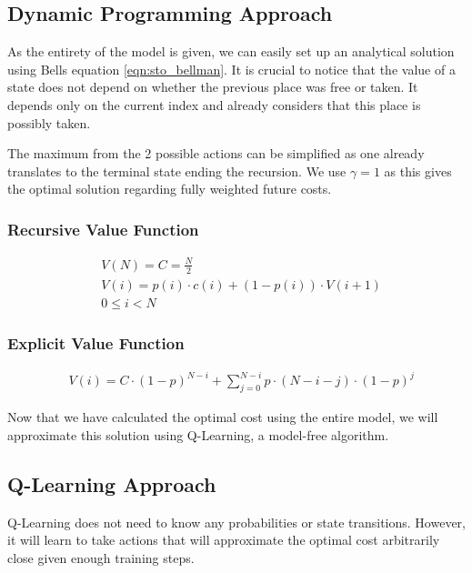 \subsection{Dynamic Programming Approach}
\label{subsec:dp_approach}
As the entirety of the model is given, we can easily set up an analytical solution using Bells equation \ref{eqn:sto_bellman}. It is crucial to notice that the value of a state does not depend on whether the previous place was free or taken. It depends only on the current index and already considers that this place is possibly taken.

The maximum from the 2 possible actions can be simplified as one already translates to the terminal state ending the recursion. We use $\gamma = 1$ as this gives the optimal solution regarding fully weighted future costs. 

\subsubsection{Recursive Value Function}
\begin{equation*}
	\begin{split}
		&V(N) = C = \frac{N}{2}\\
		&V(i) = p(i) \cdot c(i) + (1-p(i)) \cdot V(i+1)\\
		&0 \leq i < N 
	\end{split}
\end{equation*}

\subsubsection{Explicit Value Function}
\begin{equation}
	\begin{split}
		&V(i) = C \cdot (1-p)^{N-i} + \sum_{j=0}^{N-i} p \cdot (N-i-j) \cdot (1-p)^{j}
	\end{split}
\end{equation}


Now that we have calculated the optimal cost using the entire model, we will approximate this solution using Q-Learning, a model-free algorithm.

\subsection{Q-Learning Approach}
\label{subsec:ql_approach}
Q-Learning does not need to know any probabilities or state transitions. However, it will learn to take actions that will approximate the optimal cost arbitrarily close given enough training steps. 

